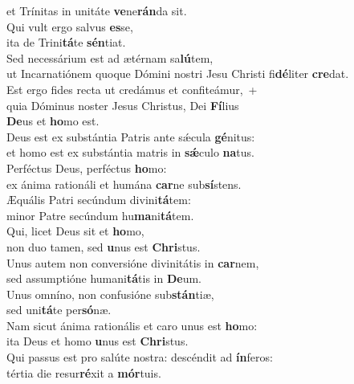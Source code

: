 \oddverse et Trínitas in unitáte \textbf{ve}ne\textbf{rán}da sit.\\
\evenverse Qui vult ergo salvus \textbf{es}se,~\*\\
\evenverse ita de Trini\textbf{tá}te \textbf{sén}tiat.\\
\oddverse Sed necessárium est ad ætérnam sa\textbf{lú}tem,~\*\\
\oddverse ut Incarnatiónem quoque Dómini nostri Jesu Christi fi\textbf{dé}liter \textbf{cre}dat.\\
\evenverse Est ergo fides recta ut credámus et confiteámur,~+\\
\evenverse  quia Dóminus noster Jesus Christus, Dei \textbf{Fí}lius~\*\\
\evenverse \textbf{De}us et \textbf{ho}mo est.\\
\oddverse Deus est ex substántia Patris ante sǽcula \textbf{gé}nitus:~\*\\
\oddverse et homo est ex substántia matris in \textbf{sǽ}culo \textbf{na}tus.\\
\evenverse Perféctus Deus, perféctus \textbf{ho}mo:~\*\\
\evenverse ex ánima rationáli et humána \textbf{car}ne sub\textbf{sí}stens.\\
\oddverse Æquális Patri secúndum divini\textbf{tá}tem:~\*\\
\oddverse minor Patre secúndum hu\textbf{ma}ni\textbf{tá}tem.\\
\evenverse Qui, licet Deus sit et \textbf{ho}mo,~\*\\
\evenverse non duo tamen, sed \textbf{u}nus est \textbf{Chri}stus.\\
\oddverse Unus autem non conversióne divinitátis in \textbf{car}nem,~\*\\
\oddverse sed assumptióne humani\textbf{tá}tis in \textbf{De}um.\\
\evenverse Unus omníno, non confusióne sub\textbf{stán}tiæ,~\*\\
\evenverse sed uni\textbf{tá}te per\textbf{só}næ.\\
\oddverse Nam sicut ánima rationális et caro unus est \textbf{ho}mo:~\*\\
\oddverse ita Deus et homo \textbf{u}nus est \textbf{Chri}stus.\\
\evenverse Qui passus est pro salúte nostra: descéndit ad \textbf{ín}feros:~\*\\
\evenverse tértia die resur\textbf{ré}xit a \textbf{mór}tuis.\\
